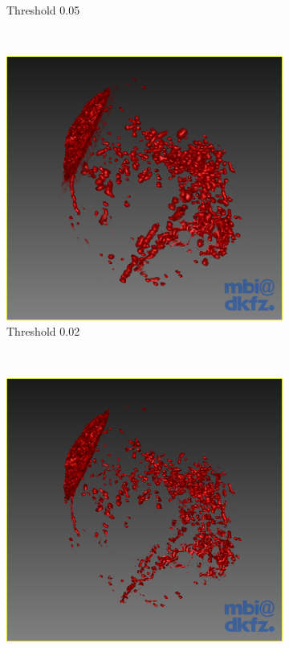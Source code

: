 \begin{figure}[H]
\begin{subfigure}[b]{0.5\textwidth}
    \caption{Threshold 0.05}
    \label{fig:thresholdingvariation1threshold1}
  \end{subfigure}
  ~%
  \begin{subfigure}[b]{0.5\textwidth}
    \includegraphics[width=\textwidth]{images/thresholding/thresholdvariation1threshold2.png}
    \caption{Threshold 0.02}
    \label{fig:thresholdingvariation1threshold2}  
  \end{subfigure}%
  ~ %
  \begin{subfigure}[b]{0.5\textwidth}
    \includegraphics[width=\textwidth]{images/thresholding/thresholdvariation1threshold3.png}

\end{subfigure}
\end{figure}
